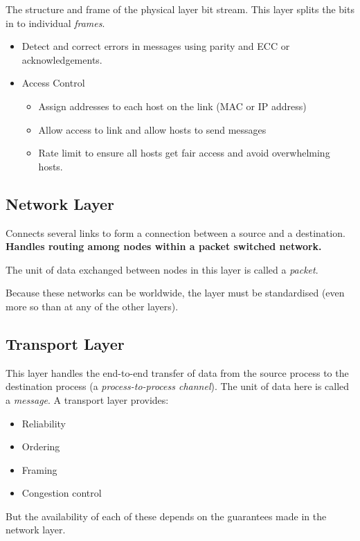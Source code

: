 The structure and frame of the physical layer bit stream.
This layer splits the bits in to individual \emph{frames}.
\begin{itemize}
	\item Detect and correct errors in messages using parity and ECC or acknowledgements.
	\item Access Control
	      \begin{itemize}
		      \item Assign addresses to each host on the link (MAC or IP address)
		      \item Allow access to link and allow hosts to send messages
		      \item Rate limit to ensure all hosts get fair access and avoid overwhelming hosts.
	      \end{itemize}
\end{itemize}

\subsection{Network Layer}\label{sub:network_layer}

Connects several links to form a connection between a source and a destination.
\textbf{Handles routing among nodes within a packet switched network.}

\begin{note}
	The unit of data exchanged between nodes in this layer is called a \emph{packet}.
\end{note}
\begin{note}
	Because these networks can be worldwide, the layer must be standardised (even more so than at any of the other layers).
\end{note}

\subsection{Transport Layer}\label{sub:transport_layer}

This layer handles the end-to-end transfer of data from the source process to the destination process (a \emph{process-to-process channel}).
The unit of data here is called a \emph{message}.
A transport layer provides:
\begin{itemize}
	\item Reliability
	\item Ordering
	\item Framing
	\item Congestion control
\end{itemize}
But the availability of each of these depends on the guarantees made in the network layer.

